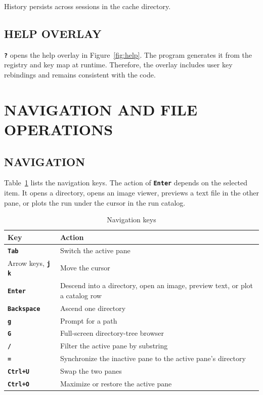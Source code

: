 \documentclass[tm]{ornltm}
\newcommand{\key}[1]{\textbf{\texttt{#1}}}
\begin{document}
History persists across sessions in the cache directory.

\subsection{HELP OVERLAY}

\key{?} opens the help overlay in Figure~\ref{fig:help}. The program generates
it from the registry and key map at runtime. Therefore, the overlay includes
user key rebindings and remains consistent with the code.

\section{NAVIGATION AND FILE OPERATIONS}
\label{sec:fileops}

\subsection{NAVIGATION}

Table~\ref{tab:nav} lists the navigation keys. The action of \key{Enter} depends
on the selected item. It opens a directory, opens an image viewer, previews a
text file in the other pane, or plots the run under the cursor in the run
catalog.

\begin{table}[ht]
  \centering
  \caption{Navigation keys}
  \label{tab:nav}
  \small
  \begin{tabular}{l l}
    \toprule
    Key & Action \\
    \midrule
    \key{Tab} & Switch the active pane \\
    Arrow keys, \key{j} \key{k} & Move the cursor \\
    \key{Enter} & Descend into a directory, open an image, preview text, or plot
      a catalog row \\
    \key{Backspace} & Ascend one directory \\
    \key{g} & Prompt for a path \\
    \key{G} & Full-screen directory-tree browser \\
    \key{/} & Filter the active pane by substring \\
    \key{=} & Synchronize the inactive pane to the active pane's directory \\
    \key{Ctrl+U} & Swap the two panes \\
    \key{Ctrl+O} & Maximize or restore the active pane \\
    \bottomrule
  \end{tabular}
\end{table}
\end{document}
